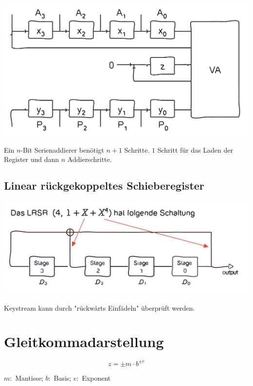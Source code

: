 \documentclass[a4paper,6pt]{article}
\begin{document}
\begin{multicols*}{3}
\begin{center}
    \includegraphics[width=1\linewidth]{resources/4-Bit-Serienaddierwerk.png}
\end{center}

Ein $n$-Bit Serienaddierer benötigt $n + 1$ Schritte. $1$ Schritt für das Laden der Register und dann $n$ Addierschritte.

\subsection*{Linear rückgekoppeltes Schieberegister}

\begin{center}
    \includegraphics[width=1\linewidth]{resources/LRSR.png}
\end{center}

Keystream kann durch "rückwärts Einfädeln" überprüft werden.

\section{Gleitkommadarstellung}


\begin{equation*}
    z = \pm m \cdot b^{\pm e}
\end{equation*}

$m:$ Mantisse; $b:$ Basis; $e:$ Exponent


\end{multicols*}
\end{document}
